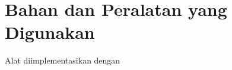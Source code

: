 \section{Bahan dan Peralatan yang Digunakan}
\label{sec:implementasi alat}

Alat diimplementasikan dengan

%
%
% 
